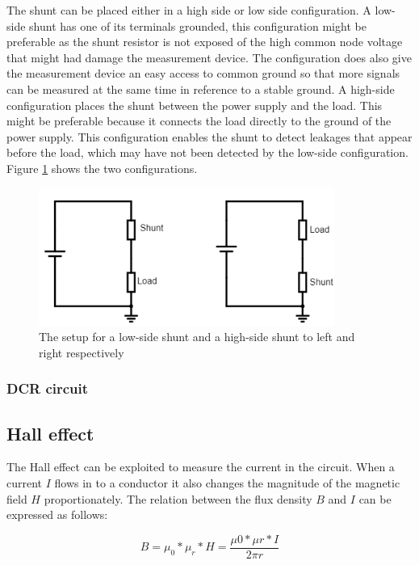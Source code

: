The shunt can be placed either in a high side or low side configuration. A low-side shunt has one of its terminals grounded, this configuration might be preferable as the shunt resistor is not exposed of the high common node voltage that might had damage the measurement device. The configuration does also give the measurement device an easy access to common ground so that more signals can be measured at the same time in reference to a stable ground. A high-side configuration places the shunt between the power supply and the load. This might be preferable because it connects the load directly to the ground of the power supply. This configuration enables the shunt to detect leakages that appear before the load, which may have not been detected by the low-side configuration. Figure \ref{fig:shunt} shows the two configurations.

\begin{figure}[h]
\centering
\includegraphics[height=4.5cm]{Project_Report/Images/shunt.PNG}
\caption{The setup for a low-side shunt and a high-side shunt to left and right respectively}
\label{fig:shunt}
\end{figure}



\subsubsection{DCR circuit}





\subsection{Hall effect}
The Hall effect can be exploited to measure the current in the circuit. When a current $I$ flows in to a conductor it also changes the magnitude of the magnetic field $H$ proportionately. The relation between the flux density $B$ and $I$ can be expressed as follows:


\begin{equation}
B= \mu_{0}*\mu_{r}*H= \dfrac{\mu{0}*\mu{r}*I}{2\pi r}
\end{equation}

